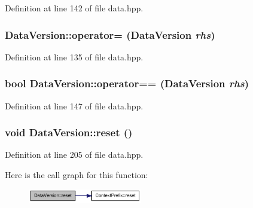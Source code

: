 Definition at line 142 of file data.hpp.\hypertarget{struct_data_version_a7d3401d93321da06993fc47f2a802009}{
\subsubsection[{operator=}]{ DataVersion::operator= ({\bf DataVersion} {\em rhs})}}
\label{struct_data_version_a7d3401d93321da06993fc47f2a802009}


Definition at line 135 of file data.hpp.\hypertarget{struct_data_version_ab42c883acee09bcbf1d487da8a79cae8}{
\subsubsection[{operator==}]{\setlength{\rightskip}{0pt plus 5cm}bool DataVersion::operator== ({\bf DataVersion} {\em rhs})}}
\label{struct_data_version_ab42c883acee09bcbf1d487da8a79cae8}


Definition at line 147 of file data.hpp.\hypertarget{struct_data_version_a78dfae7089aaeffd22198af366968bb3}{
\subsubsection[{reset}]{\setlength{\rightskip}{0pt plus 5cm}void DataVersion::reset ()}}
\label{struct_data_version_a78dfae7089aaeffd22198af366968bb3}


Definition at line 205 of file data.hpp.

Here is the call graph for this function:\nopagebreak
\begin{figure}[H]
\begin{center}
\leavevmode
\includegraphics[width=141pt]{struct_data_version_a78dfae7089aaeffd22198af366968bb3_cgraph}
\end{center}
\end{figure}


